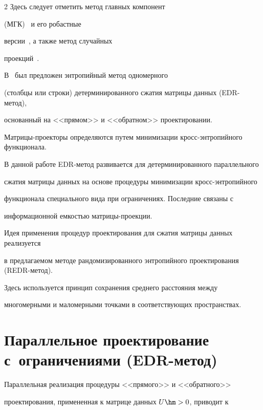 \begin{multicols}{2}
Здесь следует отметить метод главных компонент 


(МГК)~\cite{Kendall_1973, Jolliffe_2011} и его робастные 


версии~\cite{Polyak_2017}, а также метод случайных 


проекций~\cite{Bingham_2001, Vempala_2005}.





В~\cite{Popkov_2018_at_a_en} был предложен энтропийный метод одномерного 


(столбцы или строки) детерминированного сжатия матрицы данных (EDR-ме\-тод), 


основанный на <<прямом>> и <<обратном>> проектировании. 


Мат\-ри\-цы-про\-ек\-то\-ры определяются путем минимизации кросс-эн\-тро\-пий\-но\-го функционала.





В данной работе EDR-метод развивается для детерминированного параллельного 


сжатия матрицы данных на основе процедуры минимизации  кросс-эн\-тро\-пий\-но\-го 


функционала специального вида при ограничениях. Последние связаны с 


информационной емкостью мат\-ри\-цы-про\-ек\-ции.





Идея применения процедур проектирования для сжатия матрицы данных реализуется 


в предлагаемом методе рандомизированного энтропийного проектирования (REDR-ме\-тод). 


Здесь используется принцип сохранения среднего расстояния между 


многомерными и маломерными точками в соответствующих пространствах.








\section{Параллельное проектирование с~ограничениями (EDR-метод)}





Параллельная реализация  процедуры <<прямого>> и <<обратного>> 


проектирования, примененная к матрице данных $U \hm> 0$,  приводит к 



\end{multicols}
